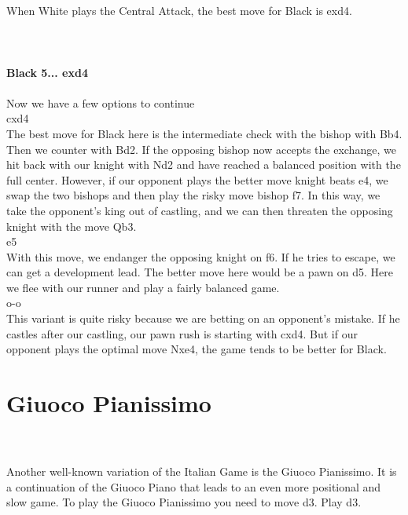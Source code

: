 \documentclass{article}
\begin{document}

\\
\\
When White plays the Central Attack, the best move for Black is exd4.\\
\\

\\
\\
\textbf{Black 5... exd4}\\
\\
Now we have a few options to continue\\cxd4\\The best move for Black here is the intermediate check with the bishop with Bb4. Then we counter with Bd2. If the opposing bishop now accepts the exchange, we hit back with our knight with Nd2 and have reached a balanced position with the full center. However, if our opponent plays the better move knight beats e4, we swap the two bishops and then play the risky move bishop f7. In this way, we take the opponent's king out of castling, and we can then threaten the opposing knight with the move Qb3.\\e5\\With this move, we endanger the opposing knight on f6. If he tries to escape, we can get a development lead. The better move here would be a pawn on d5. Here we flee with our runner and play a fairly balanced game.\\o-o\\This variant is quite risky because we are betting on an opponent's mistake. If he castles after our castling, our pawn rush is starting with cxd4. But if our opponent plays the optimal move Nxe4, the game tends to be better for Black.\\\section{ Giuoco Pianissimo}

\\
\\
Another well-known variation of the Italian Game is the Giuoco Pianissimo. It is a continuation of the Giuoco Piano that leads to an even more positional and slow game. To play the Giuoco Pianissimo you need to move d3. Play d3.\\
\\

\\
\\
\end{document}
